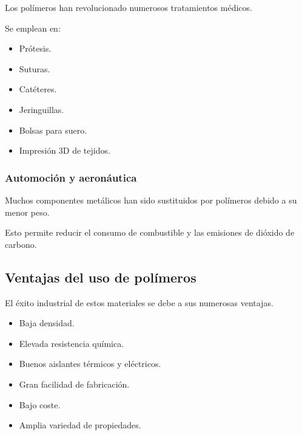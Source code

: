 Los polímeros han revolucionado numerosos tratamientos médicos.

Se emplean en:

\begin{itemize}

\item Prótesis.

\item Suturas.

\item Catéteres.

\item Jeringuillas.

\item Bolsas para suero.

\item Impresión 3D de tejidos.

\end{itemize}


\subsubsection*{Automoción y aeronáutica}

Muchos componentes metálicos han sido sustituidos por polímeros debido a su menor
peso.

Esto permite reducir el consumo de combustible y las emisiones de dióxido de carbono.


\subsection{Ventajas del uso de polímeros}

El éxito industrial de estos materiales se debe a sus numerosas ventajas.

\begin{itemize}

\item Baja densidad.

\item Elevada resistencia química.

\item Buenos aislantes térmicos y eléctricos.

\item Gran facilidad de fabricación.

\item Bajo coste.

\item Amplia variedad de propiedades.

\end{itemize}

